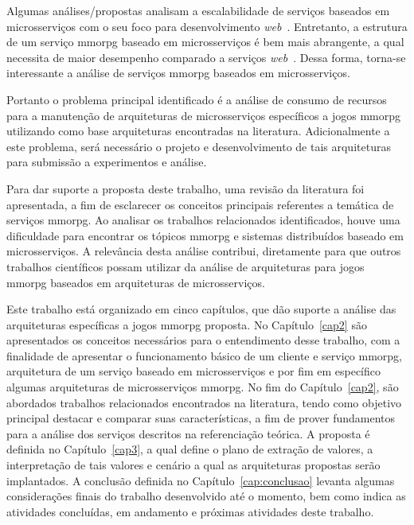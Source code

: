 Algumas análises/propostas analisam a escalabilidade de serviços baseados em microsserviços com o seu foco para desenvolvimento \textit{web}~\cite{photon_engine, mmorpg_culture}.
%
Entretanto, a estrutura de um serviço \ac{mmorpg} baseado em microsserviços é bem mais abrangente, a qual necessita de maior desempenho comparado a serviços \textit{web}~\cite{photon_engine, mmorpg_culture}.
%
Dessa forma, torna-se interessante a análise de serviços \ac{mmorpg} baseados em microsserviços.



Portanto o problema principal identificado é a análise de consumo de recursos para a manutenção de arquiteturas de microsserviços específicos a jogos \ac{mmorpg} utilizando como base arquiteturas encontradas na literatura.
%
Adicionalmente a este problema, será necessário o projeto e desenvolvimento de tais arquiteturas para submissão a experimentos e análise.



Para dar suporte a proposta deste trabalho, uma revisão da literatura foi apresentada, a fim de esclarecer os conceitos principais referentes a temática de serviços \ac{mmorpg}.
%
Ao analisar os trabalhos relacionados identificados, houve uma dificuldade para encontrar os tópicos \ac{mmorpg} e sistemas distribuídos baseado em microsserviços.
%
A relevância desta análise contribui, diretamente para que outros trabalhos científicos possam utilizar da análise de arquiteturas para jogos \ac{mmorpg} baseados em arquiteturas de microsserviços.



Este trabalho está organizado em cinco capítulos, que dão suporte a análise das arquiteturas específicas a jogos \ac{mmorpg} proposta.
%
No Capítulo~\ref{cap2} são apresentados os conceitos necessários para o entendimento desse trabalho, com a finalidade de apresentar o funcionamento básico de um cliente e serviço \ac{mmorpg}, arquitetura de um serviço baseado em microsserviços e por fim em específico algumas arquiteturas de microsserviços \ac{mmorpg}.
%
No fim do Capítulo~\ref{cap2}, são abordados trabalhos relacionados encontrados na literatura, tendo como objetivo principal destacar e comparar suas características, a fim de prover fundamentos para a análise dos serviços descritos na referenciação teórica.
%
A proposta é definida no Capítulo~\ref{cap3}, a qual define o plano de extração de valores, a interpretação de tais valores e cenário a qual as arquiteturas propostas serão implantados.
%
A conclusão definida no Capítulo~\ref{cap:conclusao} levanta algumas considerações finais do trabalho desenvolvido até o momento, bem como indica as atividades concluídas, em andamento e próximas atividades deste trabalho.



